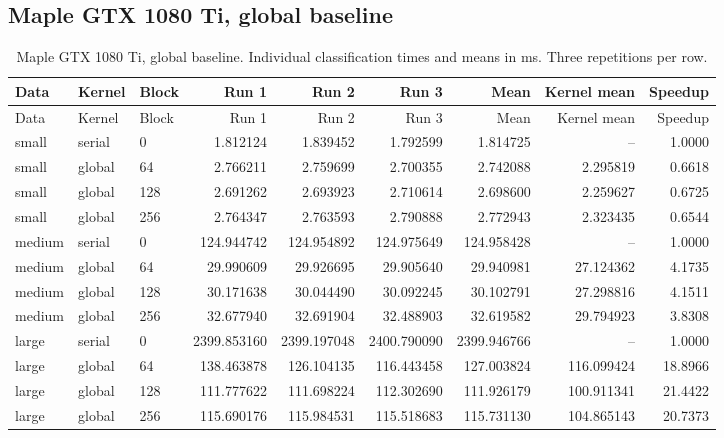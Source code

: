 \subsection{Maple GTX 1080 Ti, global baseline}
\small
\begin{longtable}{lllrrrrrr}
\caption{Maple GTX 1080 Ti, global baseline. Individual classification times and means in ms. Three repetitions per row.}\\
\toprule
Data & Kernel & Block & Run 1 & Run 2 & Run 3 & Mean & Kernel mean & Speedup \\
\midrule\endfirsthead
\toprule
Data & Kernel & Block & Run 1 & Run 2 & Run 3 & Mean & Kernel mean & Speedup \\
\midrule\endhead
\bottomrule\endfoot
small & serial & 0 & 1.812124 & 1.839452 & 1.792599 & 1.814725 & -- & 1.0000 \\
small & global & 64 & 2.766211 & 2.759699 & 2.700355 & 2.742088 & 2.295819 & 0.6618 \\
small & global & 128 & 2.691262 & 2.693923 & 2.710614 & 2.698600 & 2.259627 & 0.6725 \\
small & global & 256 & 2.764347 & 2.763593 & 2.790888 & 2.772943 & 2.323435 & 0.6544 \\
medium & serial & 0 & 124.944742 & 124.954892 & 124.975649 & 124.958428 & -- & 1.0000 \\
medium & global & 64 & 29.990609 & 29.926695 & 29.905640 & 29.940981 & 27.124362 & 4.1735 \\
medium & global & 128 & 30.171638 & 30.044490 & 30.092245 & 30.102791 & 27.298816 & 4.1511 \\
medium & global & 256 & 32.677940 & 32.691904 & 32.488903 & 32.619582 & 29.794923 & 3.8308 \\
large & serial & 0 & 2399.853160 & 2399.197048 & 2400.790090 & 2399.946766 & -- & 1.0000 \\
large & global & 64 & 138.463878 & 126.104135 & 116.443458 & 127.003824 & 116.099424 & 18.8966 \\
large & global & 128 & 111.777622 & 111.698224 & 112.302690 & 111.926179 & 100.911341 & 21.4422 \\
large & global & 256 & 115.690176 & 115.984531 & 115.518683 & 115.731130 & 104.865143 & 20.7373 \\
\end{longtable}\normalsize

